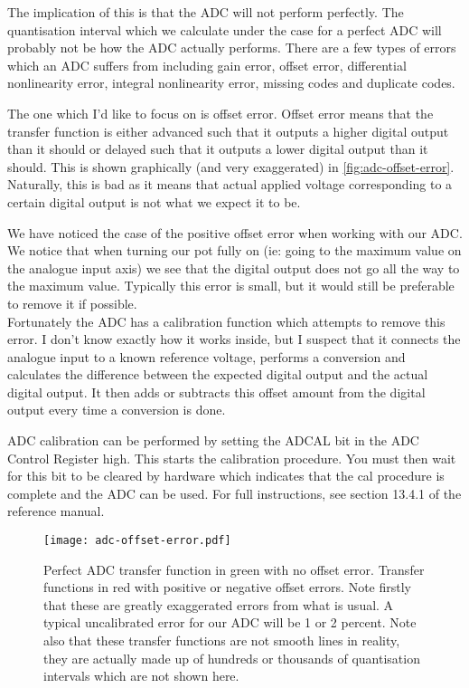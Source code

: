 The implication of this is that the ADC will not perform perfectly. The quantisation interval which we calculate under the case for a perfect ADC will probably not be how the ADC actually performs.
There are a few types of errors which an ADC suffers from including gain error, offset error, differential nonlinearity error, integral nonlinearity error, missing codes and duplicate codes. 

The one which I'd like to focus on is offset error. Offset error means that the transfer function is either advanced such that it outputs a higher digital output than it should or delayed such that it outputs a lower digital output than it should. 
This is shown graphically (and very exaggerated) in \autoref{fig:adc-offset-error}. Naturally, this is bad as it means that actual applied voltage corresponding to a certain digital output is not what we expect it to be. 

We have noticed the case of the positive offset error when working with our ADC. We notice that when turning our pot fully on (ie: going to the maximum value on the analogue input axis) we see that the digital output does not go all the way to the maximum value. Typically this error is small, but it would still be preferable to remove it if possible.\\

Fortunately the ADC has a calibration function which attempts to remove this error. I don't know exactly how it works inside, but I suspect that it connects the analogue input to a known reference voltage, performs a conversion and calculates the difference between the expected digital output and the actual digital output. It then adds or subtracts this offset amount from the digital output every time a conversion is done.

ADC calibration can be performed by setting the ADCAL bit in the ADC Control Register high. This starts the calibration procedure. You must then wait for this bit to be cleared by hardware which indicates that the cal procedure is complete and the ADC can be used. For full instructions, see section 13.4.1 of the reference manual. 

\begin{figure}
  \centering
  \texttt{[image: adc-offset-error.pdf]}
  \caption{Perfect ADC transfer function in green with no offset error. Transfer functions in red with positive or negative offset errors. Note firstly that these are greatly exaggerated errors from what is usual. A typical uncalibrated error for our ADC will be 1 or 2 percent. Note also that these transfer functions are not smooth lines in reality, they are actually made up of hundreds or thousands of quantisation intervals which are not shown here.}
  \label{fig:adc-offset-error}
\end{figure}


